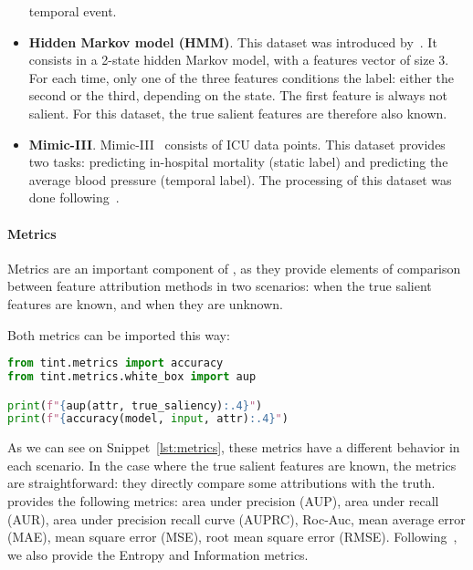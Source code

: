 \begin{itemize}
        temporal event.
    \item \textbf{Hidden Markov model (HMM)}.
        This dataset was introduced by~\citep{crabbe2021explaining}.
        It consists in a 2-state hidden Markov model, with a features vector of size 3.
        For each time, only one of the three features conditions the label: either the second or the third, depending
        on the state.
        The first feature is always not salient.
        For this dataset, the true salient features are therefore also known.
    \item \textbf{Mimic-III}.
        Mimic-III~\citep{johnson2016mimic} consists of ICU data points.
        This dataset provides two tasks: predicting in-hospital mortality (static label) and predicting the
        average blood pressure (temporal label).
        The processing of this dataset was done following~\citep{tonekaboni2020went, crabbe2021explaining}.
\end{itemize}

\newpage

\paragraph{Metrics}

Metrics are an important component of \texttt{}, as they provide elements of comparison
between feature attribution methods in two scenarios: when the true salient features are known, and when they are
unknown.

Both metrics can be imported this way:

\begin{lstlisting}[language=Python, caption=Attribution evaluation example, label={lst:metrics}]
from tint.metrics import accuracy
from tint.metrics.white_box import aup

print(f"{aup(attr, true_saliency):.4}")
print(f"{accuracy(model, input, attr):.4}")
\end{lstlisting}

As we can see on Snippet~\ref{lst:metrics}, these metrics have a different behavior in each scenario.
In the case where the true salient features are known, the metrics are straightforward: they directly compare some
attributions with the truth.
\texttt{} provides the following metrics: area under precision (AUP), area under recall (AUR),
area under precision recall curve (AUPRC), Roc-Auc, mean average error (MAE), mean square error (MSE), root mean square
error (RMSE).
Following~\citep{crabbe2021explaining}, we also provide the Entropy and Information metrics.

